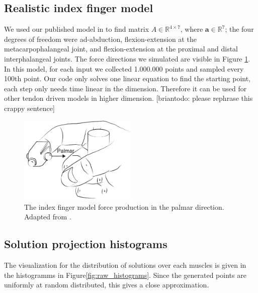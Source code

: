 \subsection{Realistic index finger model}
\label{ss:finger}
We used our published model in \cite{Valero-Cuevas1998Large} to find matrix $A \in \mathbb{R}^{4 \times 7}$, where $\textbf{a} \in \mathbb{R}^7$; the four degrees of freedom were ad-abduction, flexion-extension at the metacarpophalangeal joint, and flexion-extension at the proximal and distal interphalangeal joints.
The force directions we simulated are visible in Figure \ref{fig:finger}. In this model, for each input we collected 1.000.000 points and sampled every 100th point. Our code only solves one linear equation to find the starting point, each step only needs time linear in the dimension. Therefore it can be used for other tendon driven models in higher dimension. [briantodo: please rephrase this crappy sentence] 

\begin{figure}[htbp]
  \centering
  \includegraphics[width=0.5\textwidth]{sections/figs/finger.pdf}
  \caption{The index finger model force production in the palmar direction. Adapted from \cite{Valero-Cuevas1998Large}.}
  \label{fig:finger}
\end{figure}



\subsection{Solution projection histograms}
The visualization for the distribution of solutions over each muscles is given in the histogramms in Figure\ref{fig:raw_histograms}. Since the generated points are uniformly at random distributed, this gives a close approximation. %

